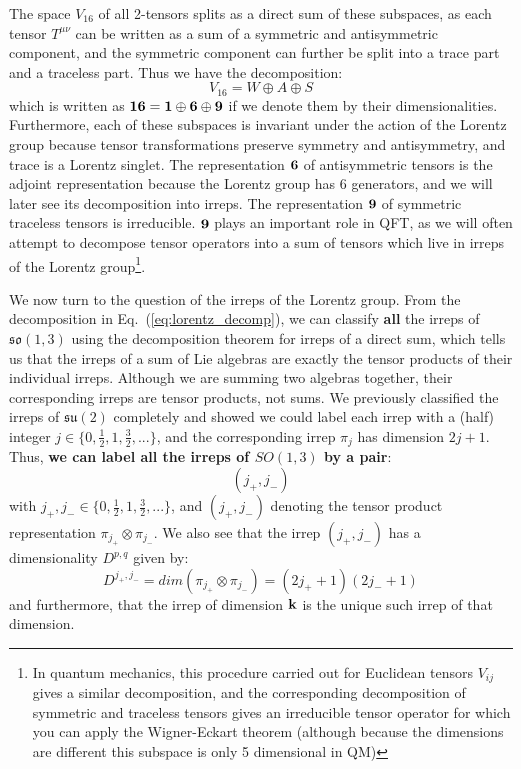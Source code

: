 \documentclass[11pt, oneside]{article}   	%
\theoremstyle{definition}
\begin{document}
The space $V_{16}$ of all 2-tensors splits as a direct sum of these subspaces, as each 
tensor $T^{\mu\nu}$ can be written as a sum of a symmetric and antisymmetric component, and the symmetric component 
can further be split into a trace part and a traceless part. Thus we have the decomposition:
\begin{equation}
	V_{16} = W\oplus A\oplus S
\end{equation}
which is written as $\bf 16 = 1\oplus 6\oplus 9$ if we denote them by their dimensionalities. Furthermore, each of these 
subspaces is invariant under the action of the Lorentz group because tensor transformations preserve symmetry and 
antisymmetry, and trace is a Lorentz singlet. The representation $\bf 6$ of antisymmetric tensors is the adjoint representation 
because the Lorentz group has 6 generators, and we will later see its decomposition into irreps. The representation $\bf 9$ 
of symmetric traceless tensors is irreducible. $\bf 9$ plays an important role in QFT, as 
we will often attempt to decompose tensor operators into a sum of tensors which live in irreps of the Lorentz group\footnote{In 
quantum mechanics, this procedure carried out for 
Euclidean tensors $V_{ij}$ gives a similar decomposition, and the corresponding decomposition of symmetric and 
traceless tensors gives an irreducible tensor operator for which you can apply the Wigner-Eckart theorem (although because 
the dimensions are different this subspace is only 5 dimensional in QM)}. 


We now turn to the question of the irreps of the Lorentz group. From the decomposition in Eq.~(\ref{eq:lorentz_decomp}), 
we can classify \textbf{all} the irreps of $\mathfrak{so}(1, 3)$ using the decomposition theorem for irreps of a direct sum, which 
tells us that the irreps of a sum of Lie algebras are exactly the tensor products of their individual irreps. Although we are 
summing two algebras together, their corresponding irreps are tensor products, not sums. We previously classified the 
irreps of $\mathfrak{su}(2)$ completely and showed we could label each irrep with a (half) integer $j\in\{0, \frac{1}{2}, 1, 
\frac{3}{2}, ...\}$, and the corresponding irrep $\pi_j$ has dimension $2j + 1$. Thus, \textbf{we can label all the 
irreps of $SO(1, 3)$ by a pair}:
\begin{equation}
	(j_+, j_-)
\end{equation}
with $j_+, j_-\in\{0, \frac{1}{2}, 1, \frac{3}{2}, ...\}$, and $(j_+, j_-)$ denoting the tensor product representation $\pi_{j_+}\otimes\pi_{j_-}$. 
We also see that the irrep $(j_+, j_-)$ has a dimensionality $D^{p, q}$ given by:
\begin{equation}
	D^{j_+, j_-} = dim(\pi_{j_+}\otimes\pi_{j_-}) = (2j_+ + 1)(2j_- + 1)
\end{equation}
and furthermore, that the irrep of dimension $\bf k$ is the unique such irrep of that dimension.
\end{document}
